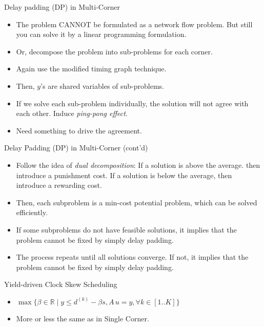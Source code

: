 \documentclass[
  ignorenonframetext,
]{beamer}
\providecommand{\tightlist}{%
  \setlength{\itemsep}{0pt}\setlength{\parskip}{0pt}}
\begin{document}
\begin{frame}{Delay padding (DP) in Multi-Corner}
\protect\hypertarget{delay-padding-dp-in-multi-corner}{}
\begin{itemize}
\tightlist
\item
  The problem CANNOT be formulated as a network flow problem. But still
  you can solve it by a linear programming formulation.
\item
  Or, decompose the problem into sub-problems for each corner.
\item
  Again use the modified timing graph technique.
\item
  Then, \(y\)'s are shared variables of sub-problems.
\item
  If we solve each sub-problem individually, the solution will not agree
  with each other. Induce \emph{ping-pong effect}.
\item
  Need something to drive the agreement.
\end{itemize}
\end{frame}

\begin{frame}{Delay Padding (DP) in Multi-Corner (cont'd)}
\protect\hypertarget{delay-padding-dp-in-multi-corner-contd}{}
\begin{itemize}
\tightlist
\item
  Follow the idea of \emph{dual decomposition}: If a solution is above
  the average. then introduce a punishment cost. If a solution is below
  the average, then introduce a rewarding cost.
\item
  Then, each subproblem is a min-cost potential problem, which can be
  solved efficiently.
\item
  If some subproblems do not have feasible solutions, it implies that
  the problem cannot be fixed by simply delay padding.
\item
  The process repeats until all solutions converge. If not, it implies
  that the problem cannot be fixed by simply delay padding.
\end{itemize}
\end{frame}

\begin{frame}{Yield-driven Clock Skew Scheduling}
\protect\hypertarget{yield-driven-clock-skew-scheduling-1}{}
\begin{itemize}
\tightlist
\item
  \(\max\{\beta \in \mathbb{R} \mid y \leq d^{(k)} - \beta s, A\,u = y, \forall k\in[1..K]\}\)
\item
  More or less the same as in Single Corner.
\end{itemize}
\end{frame}
\end{document}
